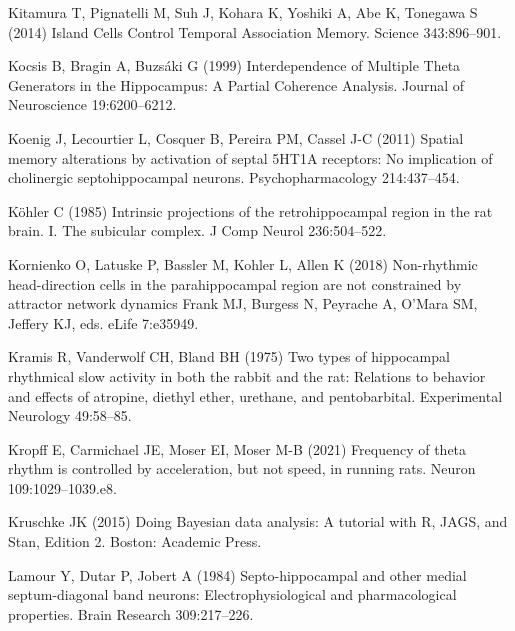 \documentclass[
  12pt,
  a4paper,
  openany]{book}
\newlength{\cslhangindent}
\newlength{\cslentryspacingunit} %
\newenvironment{CSLReferences}[2] %
 {%
  \setlength{\parindent}{0pt}
  \ifodd #1
  \let\oldpar\par
  \def\par{\hangindent=\cslhangindent\oldpar}
  \fi
  \setlength{\parskip}{#2\cslentryspacingunit}
 }%
 {}
\begin{document}
\begin{CSLReferences}{1}{0}
\leavevmode{}%
Kitamura T, Pignatelli M, Suh J, Kohara K, Yoshiki A, Abe K, Tonegawa S (2014) Island {Cells} {Control} {Temporal} {Association} {Memory}. Science 343:896--901.

\leavevmode{}%
Kocsis B, Bragin A, Buzsáki G (1999) Interdependence of {Multiple} {Theta} {Generators} in the {Hippocampus}: A {Partial} {Coherence} {Analysis}. Journal of Neuroscience 19:6200--6212.

\leavevmode{}%
Koenig J, Lecourtier L, Cosquer B, Pereira PM, Cassel J-C (2011) Spatial memory alterations by activation of septal {5HT1A} receptors: No implication of cholinergic septohippocampal neurons. Psychopharmacology 214:437--454.

\leavevmode{}%
Köhler C (1985) Intrinsic projections of the retrohippocampal region in the rat brain. {I}. {The} subicular complex. J Comp Neurol 236:504--522.

\leavevmode{}%
Kornienko O, Latuske P, Bassler M, Kohler L, Allen K (2018) Non-rhythmic head-direction cells in the parahippocampal region are not constrained by attractor network dynamics Frank MJ, Burgess N, Peyrache A, O'Mara SM, Jeffery KJ, eds. eLife 7:e35949.

\leavevmode{}%
Kramis R, Vanderwolf CH, Bland BH (1975) Two types of hippocampal rhythmical slow activity in both the rabbit and the rat: Relations to behavior and effects of atropine, diethyl ether, urethane, and pentobarbital. Experimental Neurology 49:58--85.

\leavevmode{}%
Kropff E, Carmichael JE, Moser EI, Moser M-B (2021) Frequency of theta rhythm is controlled by acceleration, but not speed, in running rats. Neuron 109:1029--1039.e8.

\leavevmode{}%
Kruschke JK (2015) Doing {Bayesian} data analysis: A tutorial with {R}, {JAGS}, and {Stan}, Edition 2. Boston: Academic Press.

\leavevmode{}%
Lamour Y, Dutar P, Jobert A (1984) Septo-hippocampal and other medial septum-diagonal band neurons: Electrophysiological and pharmacological properties. Brain Research 309:217--226.


\end{CSLReferences}
\end{document}
